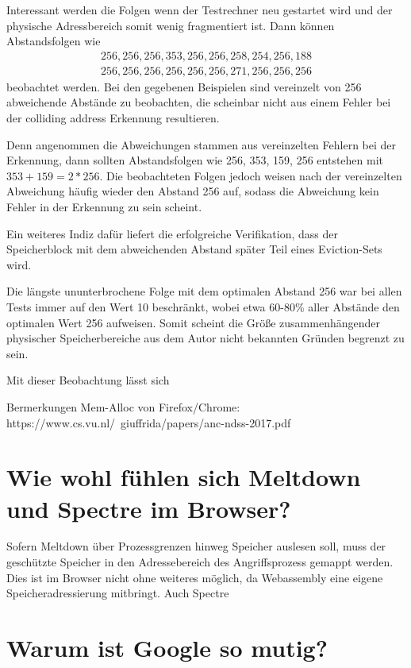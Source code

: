 Interessant werden die Folgen wenn der Testrechner neu gestartet wird und der physische Adressbereich somit wenig fragmentiert ist.
Dann können Abstandsfolgen wie 
\begin{align*} 
256, 256, 256, 353, 256, 256, 258, 254, 256, 188\\
256, 256, 256, 256, 256, 256, 271, 256, 256, 256
\end{align*}
beobachtet werden.
Bei den gegebenen Beispielen sind vereinzelt von 256 abweichende Abstände zu beobachten, die scheinbar nicht aus einem Fehler bei der colliding address Erkennung resultieren.

Denn angenommen die Abweichungen stammen aus vereinzelten Fehlern bei der Erkennung, dann sollten Abstandsfolgen wie 256, 353, 159, 256 entstehen mit $353+159=2*256$.
Die beobachteten Folgen jedoch weisen nach der vereinzelten Abweichung häufig wieder den Abstand 256 auf, sodass die Abweichung kein Fehler in der Erkennung zu sein scheint.

Ein weiteres Indiz dafür liefert die erfolgreiche Verifikation, dass der Speicherblock mit dem abweichenden Abstand später Teil eines Eviction-Sets wird.

Die längste ununterbrochene Folge mit dem optimalen Abstand 256 war bei allen Tests immer auf den Wert 10 beschränkt, wobei etwa 60-80\% aller Abstände den optimalen Wert 256 aufweisen.
Somit scheint die Größe zusammenhängender physischer Speicherbereiche aus dem Autor nicht bekannten Gründen begrenzt zu sein.

Mit dieser Beobachtung lässt sich 

Bermerkungen Mem-Alloc von Firefox/Chrome: https://www.cs.vu.nl/~giuffrida/papers/anc-ndss-2017.pdf
\cite{ASLROnTheLine}

\section{Wie wohl fühlen sich Meltdown und Spectre im Browser?}
\label{MeltdownSpectreBrowser}

Sofern Meltdown über Prozessgrenzen hinweg Speicher auslesen soll, muss der geschützte Speicher in den Adressebereich des Angriffsprozess gemappt werden.
Dies ist im Browser nicht ohne weiteres möglich, da Webassembly eine eigene Speicheradressierung mitbringt.
Auch Spectre

\section{Warum ist Google so mutig?}

